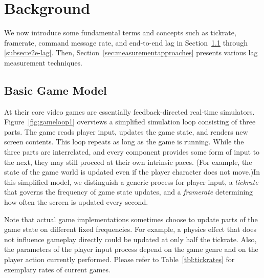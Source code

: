 \section{Background}
\label{sec:background}

We now introduce some fundamental terms and concepts such as tickrate, framerate, command message rate, and end-to-end lag in Section~\ref{subsec:game-model} through \ref{subsec:e2e-lag}. Then, Section~\ref{sec:measurementapproaches} presents various lag measurement techniques.





\subsection{Basic Game Model}
\label{subsec:game-model}


At their core video games are essentially feedback-directed real-time simulators. Figure~\ref{fig:gameloop1} overviews a simplified simulation loop consisting of three parts.
The game reads player input, updates the game state, and renders new screen contents. This loop repeats as long as the game is running. While the three parts are interrelated, and every component provides some form of input to the next, they may still proceed at their own intrinsic paces. (For example, the state of the game world is updated even if the player character does not move.)In this simplified model, we distinguish a generic process for player input, a \textit{tickrate} that governs the frequency of game state updates, and a \textit{framerate} determining how often the screen is updated every second.

Note that actual game implementations sometimes choose to update parts of the game state on different fixed frequencies. For example, a physics effect that does not influence gameplay directly could be updated at only half the tickrate. Also, the parameters of the player input process depend on the game genre and on the player action currently performed. Please refer to Table~\ref{tbl:tickrates} for exemplary rates of current games.

